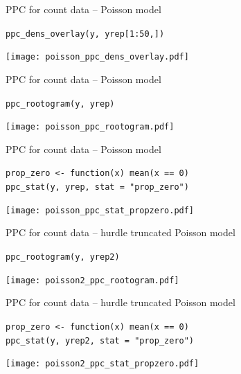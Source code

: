 \documentclass[t]{beamer}
\begin{document}
\begin{frame}{PPC for count data -- Poisson model}
  
  \vspace{-1\baselineskip}
  \texttt{ppc\_dens\_overlay(y, yrep[1:50,])}

    \texttt{[image: poisson\_ppc\_dens\_overlay.pdf]}

\end{frame}

\begin{frame}{PPC for count data -- Poisson model}
  
  \vspace{-1\baselineskip}
  \texttt{ppc\_rootogram(y, yrep)}

    \texttt{[image: poisson\_ppc\_rootogram.pdf]}

\end{frame}

\begin{frame}{PPC for count data -- Poisson model}
  
  \vspace{-1\baselineskip}
  \texttt{prop\_zero <- function(x) mean(x == 0)}\\
  \texttt{ppc\_stat(y, yrep, stat = "prop\_zero")}

    \texttt{[image: poisson\_ppc\_stat\_propzero.pdf]}

\end{frame}

\begin{frame}{PPC for count data -- hurdle truncated Poisson model}
  
  \vspace{-1\baselineskip}
  \texttt{ppc\_rootogram(y, yrep2)}

    \texttt{[image: poisson2\_ppc\_rootogram.pdf]}

\end{frame}

\begin{frame}{PPC for count data -- hurdle truncated Poisson model}
  
  \vspace{-1\baselineskip}
  \texttt{prop\_zero <- function(x) mean(x == 0)}\\
  \texttt{ppc\_stat(y, yrep2, stat = "prop\_zero")}

    \texttt{[image: poisson2\_ppc\_stat\_propzero.pdf]}

\end{frame}
\end{document}
